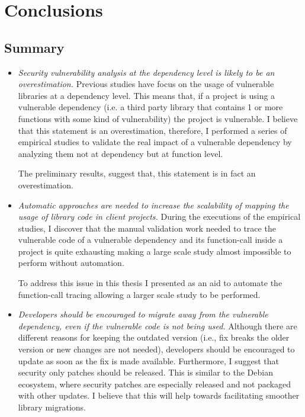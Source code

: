 \chapter{Conclusions}
\label{sec:conclusions}
\section{Summary}
\begin{itemize}
    \item \textit{Security vulnerability analysis at the dependency level is likely to be an overestimation.}
    Previous studies have focus on the usage of vulnerable libraries at a dependency level. This means that, if a project is using a vulnerable dependency (i.e. a third party library that contains 1 or more functions with some kind of vulnerability) the project is vulnerable. I believe that this statement is an overestimation, therefore, I performed a series of empirical studies to validate the real impact of a vulnerable dependency by analyzing them not at dependency but at function level.
    
    The preliminary results, suggest that, this statement is in fact an overestimation. 

    \item \textit{Automatic approaches are needed to increase the scalability of mapping the usage of library code in client projects. }
    During the executions of the empirical studies, I discover that the manual validation work needed to trace the vulnerable code of a vulnerable dependency and its function-call inside a project is quite exhausting making a large scale study almost impossible to perform without automation.
    
    To address this issue in this thesis I presented \tool[] as an aid to automate the function-call tracing allowing a larger scale study to be performed.
    
    \item \textit{Developers should be encouraged to migrate away from the vulnerable dependency, even if the vulnerable code is not being used.}
    Although there are different reasons for keeping the outdated version (i.e., fix breaks the older version or new changes are not needed), developers should be encouraged to update as soon as the fix is made available.
    Furthermore, I suggest that security only patches should be released.
    This is similar to the Debian ecosystem, where security patches are especially released and not packaged with other updates.
    I believe that this will help towards facilitating smoother library migrations.
\end{itemize}

